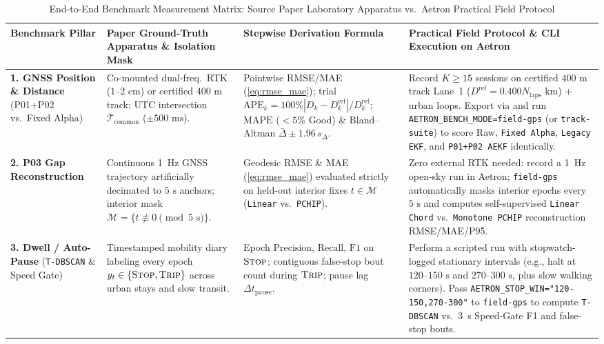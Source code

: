 \documentclass[journal]{IEEEtran}
\begin{document}
\begin{table}[t]
\centering
\caption{End-to-End Benchmark Measurement Matrix: Source Paper Laboratory Apparatus vs.\ Aetron Practical Field Protocol}
\label{tab:protocol_matrix}
\renewcommand{\arraystretch}{1.18}
\begin{tabularx}{\textwidth}{L{2.4cm} L{3.6cm} L{4.4cm} Y}
\toprule
\textbf{Benchmark Pillar} & \textbf{Paper Ground-Truth Apparatus \& Isolation Mask} & \textbf{Stepwise Derivation Formula} & \textbf{Practical Field Protocol \& CLI Execution on Aetron} \\
\midrule
\textbf{1. GNSS Position \& Distance} (P01+P02 vs.\ Fixed Alpha) \cite{tuwien2025dataset,scott2016validity,gilgenammann2020wrist}
  & Co-mounted dual-freq.\ RTK ($1\text{--}2\text{ cm}$) or certified $400\text{ m}$ track; UTC intersection $\mathcal{T}_{\text{common}}$ ($\pm 500\text{ ms}$).
  & Pointwise RMSE/MAE (\ref{eq:rmse_mae}); trial $\mathrm{APE}_k = 100\%|D_k - D_k^{\text{ref}}|/D_k^{\text{ref}}$; $\mathrm{MAPE}$ ($<5\%$ Good) \& Bland--Altman $\bar{\Delta} \pm 1.96\,s_\Delta$.
  & Record $K \ge 15$ sessions on certified $400\text{ m}$ track Lane~1 ($D^{\text{ref}} = 0.400 N_{\text{laps}}\text{ km}$) + urban loops. Export  via  and run \texttt{AETRON\_BENCH\_MODE=field-gps} (or \texttt{track-suite}) to score Raw, \texttt{Fixed Alpha}, \texttt{Legacy EKF}, and \texttt{P01+P02 AEKF} identically. \\
\midrule
\textbf{2. P03 Gap Reconstruction} \cite{czerwinski2026reconstruction}
  & Continuous 1~Hz GNSS trajectory artificially decimated to $5\text{ s}$ anchors; interior mask $\mathcal{M} = \{t \not\equiv 0 \pmod{5\text{ s}}\}$.
  & Geodesic RMSE \& MAE (\ref{eq:rmse_mae}) evaluated strictly on held-out interior fixes $t \in \mathcal{M}$ (\texttt{Linear} vs.\ \texttt{PCHIP}).
  & Zero external RTK needed: record a 1~Hz open-sky run in Aetron; \texttt{field-gps} automatically masks interior epochs every $5\text{ s}$ and computes self-supervised \texttt{Linear Chord} vs.\ \texttt{Monotone PCHIP} reconstruction RMSE/MAE/P95. \\
\midrule
\textbf{3. Dwell / Auto-Pause} (\texttt{T-DBSCAN} \& Speed Gate) \cite{zheng2009mining}
  & Timestamped mobility diary labeling every epoch $y_t \in \{\textsc{Stop}, \textsc{Trip}\}$ across urban stays and slow transit.
  & Epoch $\mathrm{Precision}$, $\mathrm{Recall}$, $\mathrm{F1}$ on $\textsc{Stop}$; contiguous false-stop bout count during $\textsc{Trip}$; pause lag $\Delta t_{\text{pause}}$.
  & Perform a scripted run with stopwatch-logged stationary intervals (e.g., halt at $120\text{--}150\text{ s}$ and $270\text{--}300\text{ s}$, plus slow walking corners). Pass \texttt{AETRON\_STOP\_WIN="120-150,270-300"} to \texttt{field-gps} to compute \texttt{T-DBSCAN} vs.\ 3~s Speed-Gate F1 and false-stop bouts. \\

\end{tabularx}
\end{table}
\end{document}
